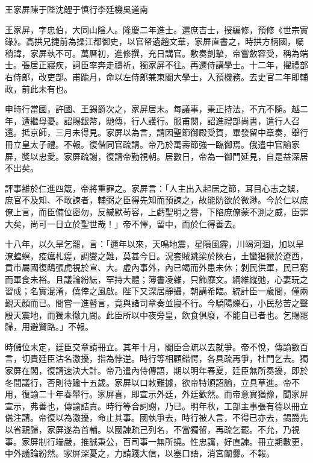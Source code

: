 
\begin{pinyinscope}
王家屏陳于陛沈鯉于慎行李廷機吳道南

王家屏，字忠伯，大同山陰人。隆慶二年進士。選庶吉士，授編修，預修《世宗實錄》。高拱兄捷前為操江都御史，以官帑遺趙文華，家屏直書之，時拱方柄國，囑稍諱，家屏執不可。萬曆初，進修撰，充日講官。敷奏剴摯，帝嘗斂容受，稱為端士。張居正寢疾，詞臣率奔走禱祈，獨家屏不往。再遷侍講學士。十二年，擢禮部右侍郎，改吏部。甫踰月，命以左侍郎兼東閣大學士，入預機務。去史官二年即輔政，前此未有也。

申時行當國，許國、王錫爵次之，家屏居末。每議事，秉正持法，不亢不隨。越二年，遭繼母憂。詔賜銀幣，馳傳，行人護行。服甫闋，詔進禮部尚書，遣行人召還。抵京師，三月未得見。家屏以為言，請因聖節御殿受賀，畢發留中章奏，舉行冊立皇太子禮。不報。復偕同官疏請。帝乃於萬壽節強一臨御焉。俄遣中官諭家屏，獎以忠愛。家屏疏謝，復請帝勤視朝。居數日，帝為一御門延見，自是益深居不出矣。

評事雒於仁進四箴，帝將重罪之。家屏言：「人主出入起居之節，耳目心志之娛，庶官不及知、不敢諫者，輔弼之臣得先知而預諫之，故能防欲於微渺。今於仁以庶僚上言，而臣備位密勿，反緘默茍容，上虧聖明之譽，下陷庶僚蒙不測之威，臣罪大矣，尚可一日立於聖世哉！」帝不懌，留中，而於仁得善去。

十八年，以久旱乞罷，言：「邇年以來，天鳴地震，星隕風霾，川竭河涸，加以旱潦蝗螟，疫癘札瘥，調燮之難，莫甚今日。況套賊跳梁於陜右，土蠻猖獗於遼西，貢市屬國復鴟張虎視於宣、大。虛內事外，內已竭而外患未休；剝民供軍，民已窮而軍食未裕。且議論紛紜，罕持大體；簿書凌雜，只飾靡文。綱維縱弛，心妻玩之習成；名實混淆，僥倖之風啟。陛下又深居靜攝，朝講希臨。統計臣一歲間，僅兩覲天顏而已。間嘗一進瞽言，竟與諸司章奏並寢不行。今驕陽爍石，小民愁苦之聲殷天震地，而獨未徹九閽。此臣所以中夜旁皇，飲食俱廢，不能自已者也。乞賜罷歸，用避賢路。」不報。

時儲位未定，廷臣交章請冊立。其年十月，閣臣合疏以去就爭。帝不悅，傳諭數百言，切責廷臣沽名激擾，指為悖逆。時行等相顧錯愕，各具疏再爭，杜門乞去。獨家屏在閣，復請速決大計。帝乃遣內侍傳語，期以明年春夏，廷臣無所奏擾，即於冬間議行，否則待踰十五歲。家屏以口敕難據，欲帝特頒詔諭，立具草進。帝不用，復諭二十年春舉行。家屏喜，即宣示外廷，外廷歡然。而帝意實猶豫，聞家屏宣示，弗善也，傳諭詰責。時行等合詞謝，乃已。明年秋，工部主事張有德以冊立儀注請。帝復以為激擾，命止其事。國執爭去，時行被人言，不得已亦去，錫爵先以省親歸，家屏遂為首輔。以國諫疏己列名，不當獨留，再疏乞罷。不允，乃視事。家屏制行端嚴，推誠秉公，百司事一無所撓。性忠讜，好直諫。冊立期數更，中外議論紛然。家屏深憂之，力請踐大信，以塞口語，消宮闈釁。不報。


\end{pinyinscope}
